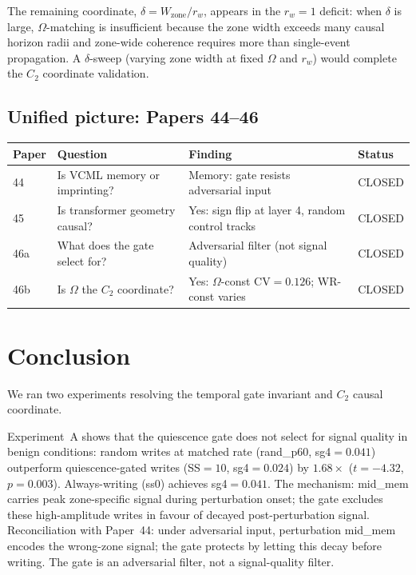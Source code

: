\documentclass[11pt,a4paper]{article}
\begin{document}
The remaining coordinate, $\delta = W_\mathrm{zone}/r_w$, appears in the $r_w=1$ deficit:
when $\delta$ is large, $\Omega$-matching is insufficient because the zone width
exceeds many causal horizon radii and zone-wide coherence requires more than
single-event propagation.
A $\delta$-sweep (varying zone width at fixed $\Omega$ and $r_w$) would complete
the $C_2$ coordinate validation.

\subsection{Unified picture: Papers 44--46}

\begin{center}
\begin{tabular}{llll}
\toprule
Paper & Question & Finding & Status \\
\midrule
44 & Is VCML memory or imprinting?     & Memory: gate resists adversarial input           & CLOSED \\
45 & Is transformer geometry causal?   & Yes: sign flip at layer 4, random control tracks & CLOSED \\
46a & What does the gate select for?   & Adversarial filter (not signal quality)           & CLOSED \\
46b & Is $\Omega$ the $C_2$ coordinate? & Yes: $\Omega$-const CV$=0.126$; WR-const varies  & CLOSED \\
\bottomrule
\end{tabular}
\end{center}

\section{Conclusion}

We ran two experiments resolving the temporal gate invariant and $C_2$ causal coordinate.

Experiment~A shows that the quiescence gate does not select for signal quality in
benign conditions: random writes at matched rate (rand\_p60, sg4$=0.041$)
outperform quiescence-gated writes (SS$=10$, sg4$=0.024$) by $1.68\times$
($t=-4.32$, $p=0.003$).
Always-writing (ss0) achieves sg4$=0.041$.
The mechanism: mid\_mem carries peak zone-specific signal during perturbation onset;
the gate excludes these high-amplitude writes in favour of decayed post-perturbation signal.
Reconciliation with Paper~44: under adversarial input, perturbation mid\_mem encodes
the wrong-zone signal; the gate protects by letting this decay before writing.
The gate is an adversarial filter, not a signal-quality filter.
\end{document}
